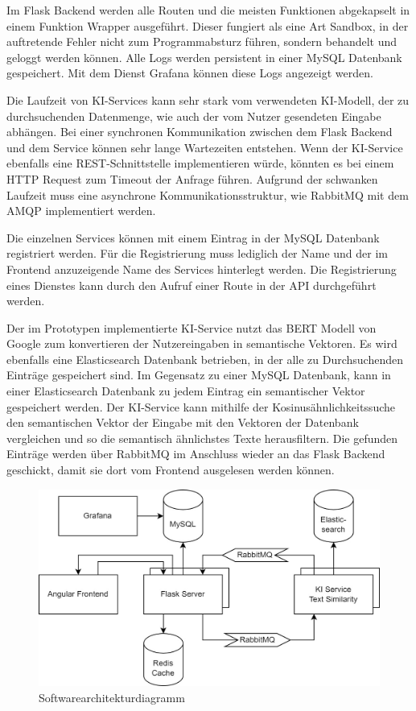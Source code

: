 Im Flask Backend werden alle Routen und die meisten Funktionen abgekapselt in einem Funktion Wrapper ausgeführt. Dieser fungiert als eine Art Sandbox, in der auftretende Fehler nicht zum Programmabsturz führen, sondern behandelt und geloggt werden können. Alle Logs werden persistent in einer MySQL Datenbank gespeichert. Mit dem Dienst Grafana können diese Logs angezeigt werden.

Die Laufzeit von KI-Services kann sehr stark vom verwendeten KI-Modell, der zu durchsuchenden Datenmenge, wie auch der vom Nutzer gesendeten Eingabe abhängen. Bei einer synchronen Kommunikation zwischen dem Flask Backend und dem Service können sehr lange Wartezeiten entstehen. Wenn der KI-Service ebenfalls eine REST-Schnittstelle implementieren würde, könnten es bei einem HTTP Request zum Timeout der Anfrage führen. Aufgrund der schwanken Laufzeit muss eine asynchrone Kommunikationsstruktur, wie RabbitMQ mit dem AMQP implementiert werden.

Die einzelnen Services können mit einem Eintrag in der MySQL Datenbank registriert werden. Für die Registrierung muss lediglich der Name und der im Frontend anzuzeigende Name des Services hinterlegt werden. Die Registrierung eines Dienstes kann durch den Aufruf einer Route in der API durchgeführt werden. 

Der im Prototypen implementierte KI-Service nutzt das BERT Modell von Google zum konvertieren der Nutzereingaben in semantische Vektoren. Es wird ebenfalls eine Elasticsearch Datenbank betrieben, in der alle zu Durchsuchenden Einträge gespeichert sind. Im Gegensatz zu einer MySQL Datenbank, kann in einer Elasticsearch Datenbank zu jedem Eintrag ein semantischer Vektor gespeichert werden. Der KI-Service kann mithilfe der Kosinusähnlichkeitssuche den semantischen Vektor der Eingabe mit den Vektoren der Datenbank vergleichen und so die semantisch ähnlichstes Texte herausfiltern. Die gefunden Einträge werden über RabbitMQ im Anschluss wieder an das Flask Backend geschickt, damit sie dort vom Frontend ausgelesen werden können.

\begin{figure}[H]
  \centering
    \includegraphics[width = 15cm]{bilder/Architektur}
    \caption{Softwarearchitekturdiagramm}
\end{figure}

